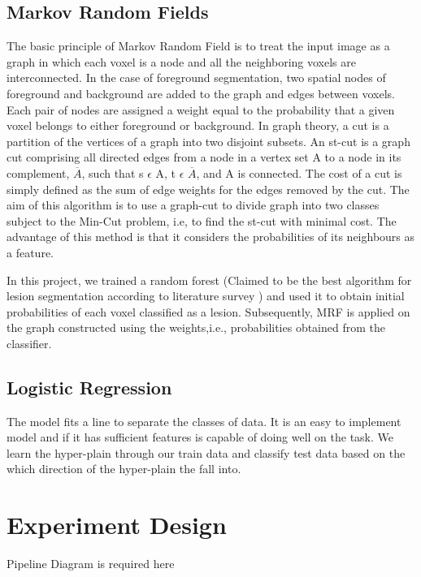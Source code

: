 \documentclass{article} %
\begin{document}
\subsection{Markov Random Fields}
The basic principle of Markov Random Field is to treat the input image as a graph in which each voxel is a node and all the neighboring voxels are interconnected. In the case of foreground segmentation, two spatial nodes of foreground and background are added to the graph and edges between voxels. Each pair of nodes are assigned a weight equal to the probability that a given voxel belongs to either foreground or background. In graph theory, a cut is a partition of the vertices of a graph into two disjoint subsets. An st-cut is a graph cut comprising all directed edges from a node in a vertex set A to a node in its complement, $\overline{A}$, such that s $\epsilon$ A, t $\epsilon$ $\overline{A}$, and A is connected. The cost of a cut is simply defined as the sum of edge weights for the edges removed by the cut. The aim of this algorithm is to use a graph-cut to divide graph into two classes subject to the Min-Cut problem, i.e, to find the st-cut with minimal cost. The advantage of this method is that it considers the probabilities of its neighbours as a feature.

In this project, we trained a random forest (Claimed to be the best algorithm for lesion segmentation according to literature survey \cite{garcia2013review}) and used it to obtain initial probabilities of each voxel classified as a lesion. Subsequently, MRF is applied on the graph constructed using the weights,i.e., probabilities obtained from the classifier.

\subsection{Logistic Regression} 
The model fits a line to separate the classes of data. It is an easy to implement model and if it has sufficient features is capable of doing well on the task. We learn the hyper-plain through our train data and classify test data based on the which direction of the hyper-plain the fall into.


\section{Experiment Design}
Pipeline Diagram is required here
\end{document}
